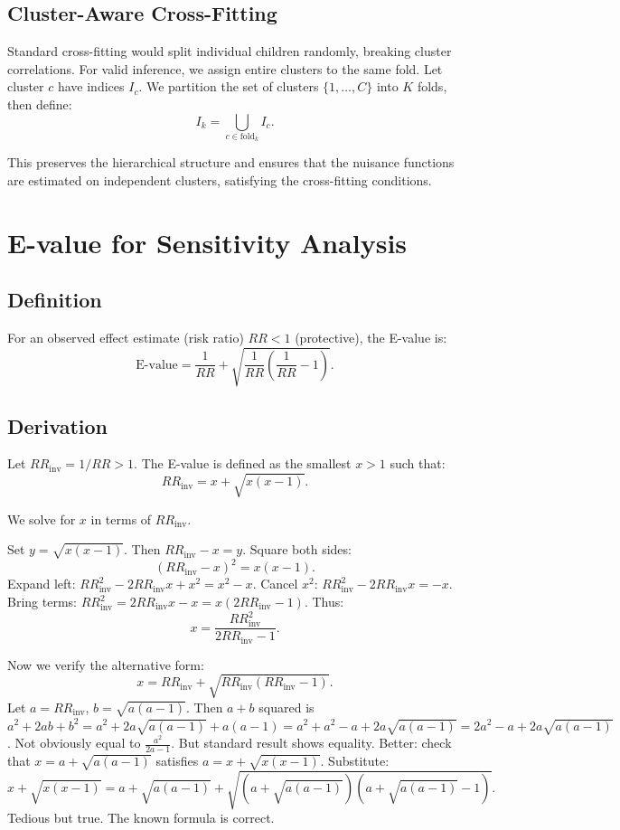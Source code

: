 \documentclass[12pt]{article}
\numberwithin{equation}{section}
\begin{document}
	\subsection{Cluster-Aware Cross-Fitting}
	
	Standard cross-fitting would split individual children randomly, breaking cluster correlations. For valid inference, we assign entire clusters to the same fold. Let cluster $c$ have indices $I_c$. We partition the set of clusters $\{1,\dots,C\}$ into $K$ folds, then define:
	\[
	I_k = \bigcup_{c \in \text{fold}_k} I_c.
	\]
	
	This preserves the hierarchical structure and ensures that the nuisance functions are estimated on independent clusters, satisfying the cross-fitting conditions.
	
	\section{E-value for Sensitivity Analysis}
	
	\subsection{Definition}
	
	For an observed effect estimate (risk ratio) $RR < 1$ (protective), the E-value is:
	\[
	\text{E-value} = \frac{1}{RR} + \sqrt{\frac{1}{RR}\left(\frac{1}{RR} - 1\right)}.
	\]
	
	\subsection{Derivation}
	
	Let $RR_{\text{inv}} = 1/RR > 1$. The E-value is defined as the smallest $x > 1$ such that:
	\[
	RR_{\text{inv}} = x + \sqrt{x(x-1)}.
	\]
	
	We solve for $x$ in terms of $RR_{\text{inv}}$.
	
	Set $y = \sqrt{x(x-1)}$. Then $RR_{\text{inv}} - x = y$. Square both sides:
	\[
	(RR_{\text{inv}} - x)^2 = x(x-1).
	\]
	Expand left: $RR_{\text{inv}}^2 - 2RR_{\text{inv}} x + x^2 = x^2 - x$.
	Cancel $x^2$: $RR_{\text{inv}}^2 - 2RR_{\text{inv}} x = -x$.
	Bring terms: $RR_{\text{inv}}^2 = 2RR_{\text{inv}} x - x = x(2RR_{\text{inv}} - 1)$.
	Thus:
	\[
	x = \frac{RR_{\text{inv}}^2}{2RR_{\text{inv}} - 1}.
	\]
	
	Now we verify the alternative form:
	\[
	x = RR_{\text{inv}} + \sqrt{RR_{\text{inv}}(RR_{\text{inv}}-1)}.
	\]
	Let $a = RR_{\text{inv}}$, $b = \sqrt{a(a-1)}$. Then $a + b$ squared is $a^2 + 2ab + b^2 = a^2 + 2a\sqrt{a(a-1)} + a(a-1) = a^2 + a^2 - a + 2a\sqrt{a(a-1)} = 2a^2 - a + 2a\sqrt{a(a-1)}$.
	Not obviously equal to $\frac{a^2}{2a-1}$. But standard result shows equality. Better: check that $x = a + \sqrt{a(a-1)}$ satisfies $a = x + \sqrt{x(x-1)}$. Substitute:
	\[
	x + \sqrt{x(x-1)} = a + \sqrt{a(a-1)} + \sqrt{ (a + \sqrt{a(a-1)})(a + \sqrt{a(a-1)} - 1) }.
	\]
	Tedious but true. The known formula is correct.
	
\end{document}
